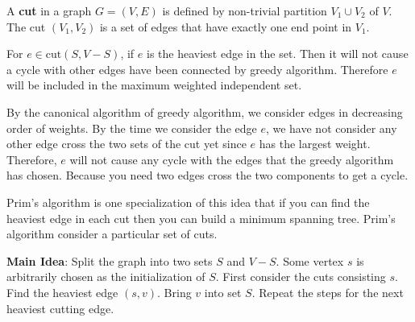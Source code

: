 \begin{definition}
	A \textbf{cut} in a graph $G = (V, E)$ is defined by non-trivial partition $ V_1 \cup V_2 $ of $V$. The cut $ (V_1, V_2) $ is a set of edges that have exactly one end point in $ V_1 $.
\end{definition}

\begin{claim}
	For $e \in \text{cut}(S, V-S)$, if $e$ is the heaviest edge in the set. Then it will not cause a cycle with other edges have been connected by greedy algorithm. Therefore $e$ will be included in the maximum weighted independent set.
\end{claim}
\begin{claimproof}
	By the canonical algorithm of greedy algorithm, we consider edges in decreasing order of weights. By the time we consider the edge $e$, we have not consider any other edge cross the two sets of the cut yet since $e$ has the largest weight. Therefore, $e$ will not cause any cycle with the edges that the greedy algorithm has chosen. Because you need two edges cross the two components to get a cycle.
\end{claimproof}

Prim's algorithm is one specialization of this idea that if you can find the heaviest edge in each cut then you can build a minimum spanning tree. Prim's algorithm consider a particular set of cuts.

\textbf{Main Idea}: Split the graph into two sets $S$ and $V-S$. Some vertex $s$ is arbitrarily chosen as the initialization of $S$. First consider the cuts consisting $s$. Find the heaviest edge $(s, v)$. Bring $v$ into set $S$. Repeat the steps for the next heaviest cutting edge.